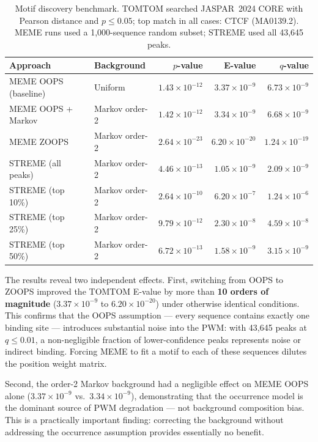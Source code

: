 \documentclass[12pt]{article}
\begin{document}
\begin{table}[htbp]
\centering
\caption{Motif discovery benchmark. TOMTOM searched JASPAR~2024 CORE with
Pearson distance and $p \leq 0.05$; top match in all cases: CTCF (MA0139.2).
MEME runs used a 1,000-sequence random subset; STREME used all 43,645 peaks.}
\label{tab:comparison}
\small
\begin{tabular}{llrrr}
\toprule
\textbf{Approach} & \textbf{Background}
  & \textbf{$p$-value} & \textbf{E-value} & \textbf{$q$-value} \\
\midrule
MEME OOPS (baseline) & Uniform
  & $1.43{\times}10^{-12}$ & $3.37{\times}10^{-9}$ & $6.73{\times}10^{-9}$ \\
MEME OOPS + Markov   & Markov order-2
  & $1.42{\times}10^{-12}$ & $3.34{\times}10^{-9}$ & $6.68{\times}10^{-9}$ \\
MEME ZOOPS           & Markov order-2
  & $2.64{\times}10^{-23}$ & $6.20{\times}10^{-20}$ & $1.24{\times}10^{-19}$ \\
STREME (all peaks)   & Markov order-2
  & $4.46{\times}10^{-13}$ & $1.05{\times}10^{-9}$  & $2.09{\times}10^{-9}$  \\
\midrule
STREME (top 10\%)    & Markov order-2
  & $2.64{\times}10^{-10}$ & $6.20{\times}10^{-7}$  & $1.24{\times}10^{-6}$  \\
STREME (top 25\%)    & Markov order-2
  & $9.79{\times}10^{-12}$ & $2.30{\times}10^{-8}$  & $4.59{\times}10^{-8}$  \\
STREME (top 50\%)    & Markov order-2
  & $6.72{\times}10^{-13}$ & $1.58{\times}10^{-9}$  & $3.15{\times}10^{-9}$  \\
\bottomrule
\end{tabular}
\end{table}

The results reveal two independent effects. First, switching from OOPS to ZOOPS
improved the TOMTOM E-value by more than \textbf{10 orders of magnitude}
($3.37 \times 10^{-9}$ to $6.20 \times 10^{-20}$) under otherwise identical
conditions. This confirms that the OOPS assumption --- every sequence contains
exactly one binding site --- introduces substantial noise into the PWM: with
43,645 peaks at $q \leq 0.01$, a non-negligible fraction of lower-confidence
peaks represents noise or indirect binding. Forcing MEME to fit a motif to
each of these sequences dilutes the position weight matrix.

Second, the order-2 Markov background had a negligible effect on MEME OOPS
alone ($3.37 \times 10^{-9}$ vs.\ $3.34 \times 10^{-9}$), demonstrating that
the occurrence model is the dominant source of PWM degradation --- not background
composition bias. This is a practically important finding: correcting the
background without addressing the occurrence assumption provides essentially
no benefit.
\end{document}

